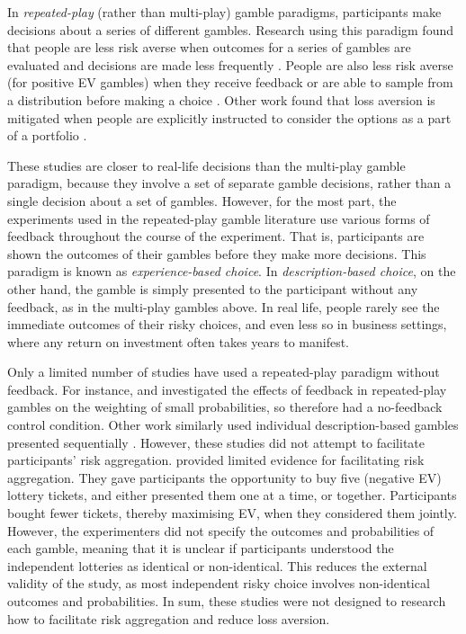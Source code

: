 \documentclass[a4paper, nobind, dvipsnames]{templates/ociamthesis}
\theoremstyle{definition}
\theoremstyle{definition}
\theoremstyle{definition}
\theoremstyle{definition}
\theoremstyle{remark}
\begin{document}
In \emph{repeated-play} (rather than multi-play) gamble paradigms, participants make
decisions about a series of different gambles. Research using this paradigm
found that people are less risk averse when outcomes for a series of gambles are
evaluated and decisions are made less frequently \autocite{gneezy1997,thaler1997,bellemare2005,beshears2016}. People are also less risk averse (for positive
EV gambles) when they receive feedback or are able to sample from a distribution
before making a choice \autocite{camilleri2011,camilleri2013,barron2003,wulff2018,ludvig2011,hertwig2004,jessup2008}. Other work found that loss
aversion is mitigated when people are explicitly instructed to consider the
options as a part of a portfolio \autocite{sokolhessner2009,sokolhessner2012}.

These studies are closer to real-life decisions than the multi-play gamble
paradigm, because they involve a set of separate gamble decisions, rather than a
single decision about a set of gambles. However, for the most part, the
experiments used in the repeated-play gamble literature use various forms of
feedback throughout the course of the experiment. That is, participants are
shown the outcomes of their gambles before they make more decisions. This
paradigm is known as \emph{experience-based choice}. In \emph{description-based choice},
on the other hand, the gamble is simply presented to the participant without any
feedback, as in the multi-play gambles above. In real life, people rarely see
the immediate outcomes of their risky choices, and even less so in business
settings, where any return on investment often takes years to manifest.

Only a limited number of studies have used a repeated-play paradigm without
feedback. For instance, \textcite{jessup2008} and \textcite{hertwig2004} investigated the effects of
feedback in repeated-play gambles on the weighting of small probabilities, so
therefore had a no-feedback control condition. Other work similarly used
individual description-based gambles presented sequentially \autocites[e.g.,][]{ert2013,joag1990}. However, these studies did not attempt to facilitate participants'
risk aggregation. \textcite{haisley2008} provided limited evidence for facilitating risk
aggregation. They gave participants the opportunity to buy five (negative EV)
lottery tickets, and either presented them one at a time, or together.
Participants bought fewer tickets, thereby maximising EV, when they considered
them jointly. However, the experimenters did not specify the outcomes and
probabilities of each gamble, meaning that it is unclear if participants
understood the independent lotteries as identical or non-identical. This reduces
the external validity of the study, as most independent risky choice involves
non-identical outcomes and probabilities. In sum, these studies were not
designed to research how to facilitate risk aggregation and reduce loss
aversion.
\end{document}
